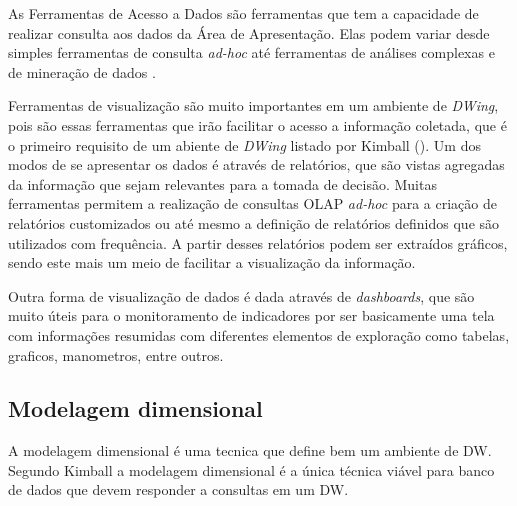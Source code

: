 As Ferramentas de Acesso a Dados são ferramentas que tem a capacidade de realizar consulta aos dados da Área de Apresentação. Elas podem variar desde simples ferramentas de consulta \emph{ad-hoc} até ferramentas de análises complexas e de mineração de dados \cite{kimball2002}.

Ferramentas de visualização são muito importantes em um ambiente de \emph{DWing}, pois são essas ferramentas que irão facilitar o acesso a informação coletada, que é o primeiro requisito de um abiente de \emph{DWing} listado por Kimball (\citeyear{kimball2002}). Um dos modos de se apresentar os dados é através de relatórios, que são vistas agregadas da informação que sejam relevantes para a tomada de decisão. Muitas ferramentas permitem a realização de consultas OLAP \emph{ad-hoc} para a criação de relatórios customizados ou até mesmo a definição de relatórios definidos que são utilizados com frequência. A partir desses relatórios podem ser extraídos gráficos, sendo este mais um meio de facilitar a visualização da informação. 

Outra forma de visualização de dados é dada através  de \emph{dashboards}, que são muito úteis para o monitoramento de indicadores por ser basicamente uma tela com informações resumidas com diferentes elementos de exploração como tabelas, graficos, manometros, entre outros.


\subsection{Modelagem dimensional}
\label{sec-dimensional-modeling}

A modelagem dimensional é uma tecnica que define bem um ambiente de DW. Segundo Kimball \citeyear{kimball2002} a modelagem dimensional é a única técnica viável para banco de dados  que devem responder a consultas em um DW.

